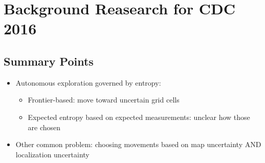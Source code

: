 \documentclass[10pt]{article}
\date{}
\theoremstyle{plain}\theorembodyfont{\normalfont}
\begin{document}
\section*{Background Reasearch for CDC 2016}

\subsection*{Summary Points}
\begin{itemize}
	\item Autonomous exploration governed by entropy:
	\begin{itemize}
		\item Frontier-based: move toward uncertain grid cells
		\item Expected entropy based on expected measurements: unclear how those are chosen
	\end{itemize}
	\item Other common problem: choosing movements based on map uncertainty AND localization uncertainty
\end{itemize}
\end{document}
